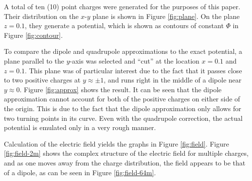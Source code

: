 \documentclass[12pt,a4paper,twoside]{article}
\begin{document}
A total of ten (10) point charges were generated for the purposes of this paper. Their distribution on the $x$-$y$ plane is shown in Figure \ref{fig:plane}. On the plane $z = 0.1$, they generate a potential, which is shown as contours of constant $\Phi$ in Figure \ref{fig:contour}.

To compare the dipole and quadrupole approximations to the exact potential, a plane parallel to the $y$-axis was selected and ``cut'' at the location $x = 0.1$ and $z = 0.1$. This plane was of particular interest due to the fact that it passes close to two positive charges at $y \approx \pm 1$, and runs right in the middle of a dipole near $y \approx 0$. Figure \ref{fig:approx} shows the result. It can be seen that the dipole approximation cannot account for both of the positive charges on either side of the origin. This is due to the fact that the dipole approximation only allows for two turning points in its curve. Even with the quadrupole correction, the actual potential is emulated only in a very rough manner.

Calculation of the electric field yields the graphs in Figure \ref{fig:field}. Figure \ref{fig:field-2m} shows the complex structure of the electric field for multiple charges, and as one moves away from the charge distribution, the field appears to be that of a dipole, as can be seen in Figure \ref{fig:field-64m}.
\end{document}
